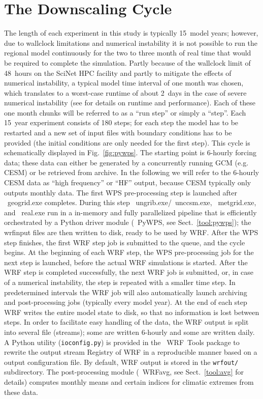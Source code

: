 \documentclass[letterpaper,12pt,headsepline,final]{scrartcl} %
\newcommand{\fig}[1]{Fig.~\ref{#1}}
\newcommand{\sect}[1]{Sect.~\ref{#1}}
\newcommand{\wrftools}{\mbox{\color{violet} \sffamily WRF~Tools}}
\newcommand{\geogrid}{\mbox{\color{orange} \ttfamily geogrid.exe}}
\newcommand{\ungrib}{\mbox{\color{purple} \ttfamily ungrib.exe}}
\newcommand{\unccsm}{\mbox{\color{red} \ttfamily unccsm.exe}}
\newcommand{\metgrid}{\mbox{\color{cyan} \ttfamily metgrid.exe}}
\newcommand{\real}{\mbox{\color{violet} \ttfamily real.exe}}
\newcommand{\PyWPS}{\mbox{\color{teal} \sffamily PyWPS}}
\newcommand{\WRFavg}{\mbox{\color{blue} \sffamily WRFavg}}
\begin{document}
\section{The Downscaling Cycle}
\label{pipe:cycle}
The length of each experiment in this study is typically 15~model years; however, due to wallclock limitations and numerical instability it is not possible to run the regional model continuously for the two to three month of real time that would be required to complete the simulation. Partly because of the wallclock limit of 48~hours on the SciNet HPC facility and partly to mitigate the effects of numerical instability, a typical model time interval of one month was chosen, which translates to a worst-case runtime of about 2~days in the case of severe numerical instability (see \citealp[][\S2.3.5]{erler2015phd} for details on runtime and performance). Each of these one month chunks will be referred to as a ``run step'' or simply a ``step''. Each 15~year experiment consists of 180 steps; for each step the model has to be restarted and a new set of input files with boundary conditions has to be provided (the initial conditions are only needed for the first step). This cycle is schematically displayed in \fig{fig:pywps}.
The starting point is 6-hourly forcing data; these data can either be generated by a concurrently running GCM (e.g. CESM) or be retrieved from archive. In the following we will refer to the 6-hourly CESM data as ``high frequency'' or ``HF'' output, because CESM typically only outputs monthly data. The first WPS pre-processing step is launched after \geogrid{} completes. During this step \ungrib{}/\unccsm{}, \metgrid{}, and \real{} run in a in-memory and fully parallelized pipeline that is efficiently orchestrated by a Python driver module (\PyWPS{}, see \sect{tool:pywps}); the \textsf{wrfinput} files are then written to disk, ready to be used by WRF. After the WPS step finishes, the first WRF step job is submitted to the queue, and the cycle begins. At the beginning of each WRF step, the WPS pre-processing job for the next step is launched, before the actual WRF simulations is started. After the WRF step is completed successfully, the next WRF job is submitted, or, in case of a numerical instability, the step is repeated with a smaller time step. In predetermined intervals the WRF job will also automatically launch archiving and post-processing jobs (typically every model year).
At the end of each step WRF writes the entire model state to disk, so that no information is lost between steps.
In order to facilitate easy handling of the data, the WRF output is split into several file (streams); some are written 6-hourly and some are written daily.
A Python utility (\texttt{ioconfig.py}) is provided in the \wrftools{} package to rewrite the output stream Registry of WRF in a reproducible manner based on a output configuration file.
By default, WRF output is stored in the \texttt{wrfout/} subdirectory. The post-processing module (\WRFavg{}, see \sect{tool:avg} for details) computes monthly means and certain indices for climatic extremes from these data.
\end{document}
